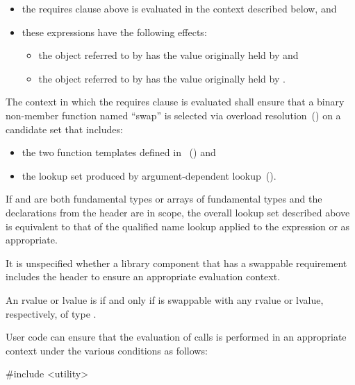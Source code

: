 \begin{addedblock}
\begin{itemdescr}
\begin{itemize}
\item the requires clause above is evaluated in the context described below, and

\item these expressions have the following effects:

\begin{itemize}
\item the object referred to by  has the value originally held by  and
\item the object referred to by  has the value originally held by .
\end{itemize}
\end{itemize}

\pnum
The context in which the requires clause is evaluated shall
ensure that a binary non-member function named ``swap'' is selected via overload
resolution~() on a candidate set that includes:

\begin{itemize}
\item the two  function templates defined in
~() and

\item the lookup set produced by argument-dependent lookup~().
\end{itemize}

\enternote If  and  are both fundamental types or arrays of
fundamental types and the declarations from the header  are in
scope, the overall lookup set described above is equivalent to that of the
qualified name lookup applied to the expression  or
 as appropriate. \exitnote

\enternote It is unspecified whether a library component that has a swappable
requirement includes the header  to ensure an appropriate
evaluation context. \exitnote

\pnum
An rvalue or lvalue  is  if and only if  is
swappable with any rvalue or lvalue, respectively, of type .

\enterexample User code can ensure that the evaluation of  calls
is performed in an appropriate context under the various conditions as follows:
\begin{codeblock}
#include <utility>


\end{codeblock}
\end{itemdescr}
\end{addedblock}
